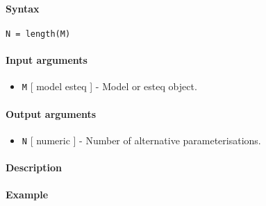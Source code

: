 


	\paragraph{Syntax}\label{syntax}

\begin{verbatim}
N = length(M)
\end{verbatim}

\paragraph{Input arguments}\label{input-arguments}

\begin{itemize}
\itemsep1pt\parskip0pt
\item
  \texttt{M} {[} model \textbar{} esteq {]} - Model or esteq object.
\end{itemize}

\paragraph{Output arguments}\label{output-arguments}

\begin{itemize}
\itemsep1pt\parskip0pt
\item
  \texttt{N} {[} numeric {]} - Number of alternative parameterisations.
\end{itemize}

\paragraph{Description}\label{description}

\paragraph{Example}\label{example}


